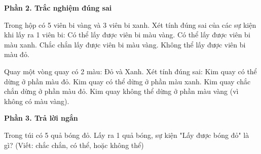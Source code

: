 \textbf{Phần 2. Trắc nghiệm đúng sai}

\begin{ex} %
Trong hộp có 5 viên bi vàng và 3 viên bi xanh. Xét tính đúng sai của các sự kiện khi lấy ra 1 viên bi:
\choiceTF
{\True Có thể lấy được viên bi màu vàng.}
{\True Có thể lấy được viên bi màu xanh.}
{Chắc chắn lấy được viên bi màu vàng.}
{\True Không thể lấy được viên bi màu đỏ.}
\end{ex}

\begin{ex} %
Quay một vòng quay có 2 màu: Đỏ và Xanh. Xét tính đúng sai:
\choiceTF
{\True Kim quay có thể dừng ở phần màu đỏ.}
{\True Kim quay có thể dừng ở phần màu xanh.}
{Kim quay chắc chắn dừng ở phần màu đỏ.}
{\True Kim quay không thể dừng ở phần màu vàng (vì không có màu vàng).}
\end{ex}

\textbf{Phần 3. Trả lời ngắn}

\begin{ex} %
Trong túi có 5 quả bóng đỏ. Lấy ra 1 quả bóng, sự kiện "Lấy được bóng đỏ" là gì? (Viết: chắc chắn, có thể, hoặc không thể)
\end{ex}

